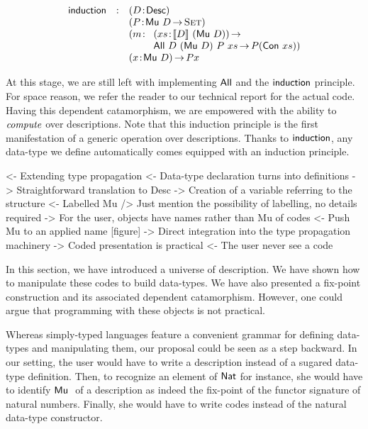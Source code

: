 \[
\begin{array}{lcll}
\F{induction} & : & \multicolumn{2}{l}{\PITEL{D}{\Desc}}                   \\
              &   & \multicolumn{2}{l}{\PITEL{P}{\Mu{D} \To \Set}}         \\
              &   & \PITEL{m}{& \PI{xs}{\descop{D}{(\Mu{D})}}              \\
              &   &           & \All{D}{(\Mu{D})}{P}{xs} \To P (\Con{xs})} \\
              &   & \multicolumn{2}{l}{\PI{x}{\Mu{D}} P x}
\end{array}
\]

At this stage, we are still left with implementing $\F{All}$ and the
$\F{induction}$ principle. For space reason, we refer the reader to
our technical report for the actual code. Having this dependent
catamorphism, we are empowered with the ability to $\emph{compute}$
over descriptions. Note that this induction principle is the first
manifestation of a generic operation over descriptions. Thanks to
$\F{induction}$, any data-type we define automatically comes equipped
with an induction principle.


\begin{wstructure}
<- Extending type propagation
    <- Data-type declaration turns into definitions
        -> Straightforward translation to Desc
        -> Creation of a variable referring to the structure
    <- Labelled Mu
        /> Just mention the possibility of labelling, no details required
        -> For the user, objects have names rather than Mu of codes
    <- Push Mu to an applied name [figure]
        -> Direct integration into the type propagation machinery
    -> Coded presentation is practical
        <- The user never see a code
\end{wstructure}


In this section, we have introduced a universe of description. We have
shown how to manipulate these codes to build data-types. We have also
presented a fix-point construction and its associated dependent
catamorphism. However, one could argue that programming with these
objects is not practical. 

Whereas simply-typed languages feature a convenient grammar for
defining data-types and manipulating them, our proposal could be seen
as a step backward. In our setting, the user would have to write a
description instead of a sugared data-type definition. Then, to
recognize an element of $\Nat$ for instance, she would have to
identify $\Mu{}$ of a description as indeed the fix-point of the
functor signature of natural numbers. Finally, she would have to write
codes instead of the natural data-type constructor.

